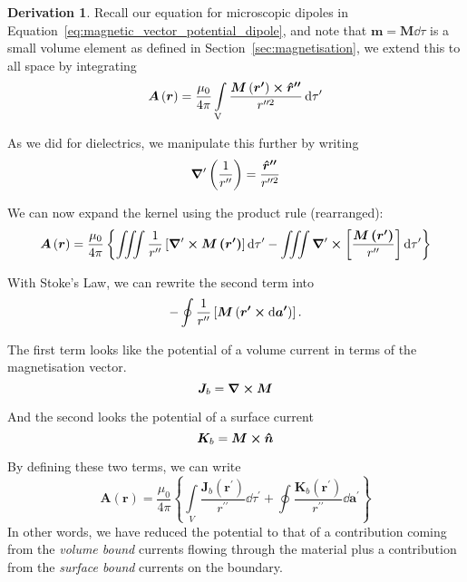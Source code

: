 \documentclass[12pt,chapterprefix=false,dvipsnames]{scrbook}
\theoremstyle{dotless}
\theoremstyle{definition}
\newtheorem{protoderivation}{Derivation}[section]
\newenvironment{derivation}
{\colorlet{shadecolor}{purple!15}\begin{shaded}\begin{protoderivation}}
			{\end{protoderivation}\end{shaded}}
\begin{document}
\begin{derivation}

	Recall our equation for microscopic dipoles in
	Equation~\ref{eq:magnetic_vector_potential_dipole}, and note that
	$\bm{m}=\bm{M}\dd{\tau}$ is a small volume element as defined in
	Section~\ref{sec:magnetisation}, we extend this to all space by
	integrating
	\begin{equation}
		\bm{A}\left(\bm{r}\right)
		=
		\frac{\mu_{0}}{4\pi}\int\limits_{\mathrm{V}}\frac{\bm{M}\left(\bm{r^\prime}\right)\cross\bm{\hat{r}^{\prime\prime}}}{r^{\prime\prime 2}}
		\dd{\tau^\prime}
	\end{equation}

	As we did for dielectrics, we manipulate this further by writing
	\begin{equation}
		\gradient^\prime\left(\frac{1}{r^{\prime\prime}}\right)
		=
		\frac{\bm{\hat{r}^{\prime\prime}}}{r^{\prime\prime 2}}
	\end{equation}

	We can now expand the kernel using the product rule
	(rearranged):
	\begin{equation}
		\bm{A}\left(\bm{r}\right)
		=
		\frac{\mu_{0}}{4\pi}\left\{\iiint\frac{1}{r^{\prime\prime}}\left[\gradient^\prime\cross\bm{M\left(\bm{r}^{\prime}\right)}\right]\dd{\tau^\prime}
		-
		\iiint\gradient^\prime\cross\left[\frac{\bm{M\left(\bm{r}^{\prime}\right)}}{r^{\prime\prime}}\right]\dd{\tau^\prime}\right\}
	\end{equation}

	With Stoke's Law, we can rewrite the second term into
	\begin{equation}
		-\oint\frac{1}{r^{\prime\prime}}\left[\bm{M}\left(\bm{r^\prime}\cross\dd{\bm{a^\prime}}\right)\right].
	\end{equation}

	The first term looks like the potential of a volume current in
	terms of the magnetisation vector.
	\begin{equation}
		\bm{J}_b = \curl{\bm{M}}
	\end{equation}

	And the second looks the potential of a surface current
	\begin{equation}
		\bm{K}_b =
		\bm{M}\cross\bm{\hat{n}}
	\end{equation}

	By defining these two terms, we can write
	\begin{equation}
		\bm{A}\left(\bm{r}\right)
		=
		\frac{\mu_{0}}{4\pi}\left\{
		\int\limits_{V}\frac{\bm{J}_b\left(\bm{r^\prime}\right)}{r^{\prime\prime}}\dd{\tau^\prime}
		+
		\oint\frac{\bm{K}_b\left(\bm{r^\prime}\right)}{r^{\prime\prime}}\dd{\bm{a}^\prime}
		\right\}
	\end{equation}
	In other words, we have reduced the potential to that of a
	contribution coming from the \textit{volume bound} currents
	flowing through the material plus a contribution from the
	\textit{surface bound} currents on the boundary.
\end{derivation}
\end{document}
